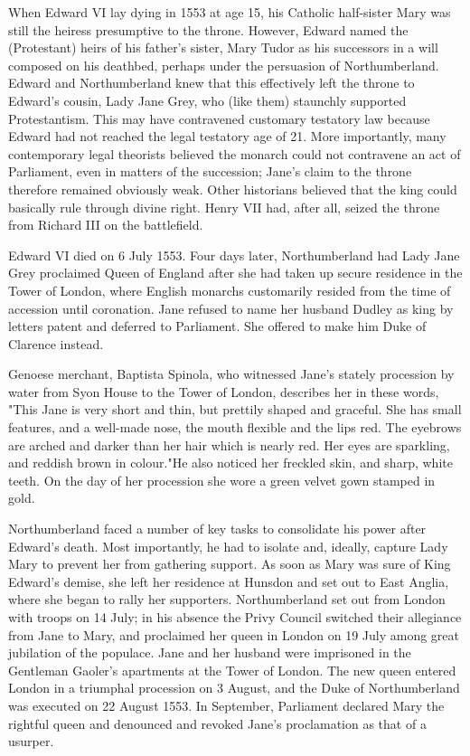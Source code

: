\documentclass{article}
\begin{document}
When Edward VI lay dying in 1553 at age 15, his Catholic half-sister Mary was still the heiress presumptive to the throne. However, Edward named the (Protestant) heirs of his father's sister, Mary Tudor as his successors in a will composed on his deathbed, perhaps under the persuasion of Northumberland. Edward and Northumberland knew that this effectively left the throne to Edward's cousin, Lady Jane Grey, who (like them) staunchly supported Protestantism. This may have contravened customary testatory law because Edward had not reached the legal testatory age of 21. More importantly, many contemporary legal theorists believed the monarch could not contravene an act of Parliament, even in matters of the succession; Jane's claim to the throne therefore remained obviously weak. Other historians believed that the king could basically rule through divine right. Henry VII had, after all, seized the throne from Richard III on the battlefield.

Edward VI died on 6 July 1553. Four days later, Northumberland had Lady Jane Grey proclaimed Queen of England after she had taken up secure residence in the Tower of London, where English monarchs customarily resided from the time of accession until coronation. Jane refused to name her husband Dudley as king by letters patent and deferred to Parliament. She offered to make him Duke of Clarence instead.

Genoese merchant, Baptista Spinola, who witnessed Jane's stately procession by water from Syon House to the Tower of London, describes her in these words, "This Jane is very short and thin, but prettily shaped and graceful. She has small features, and a well-made nose, the mouth flexible and the lips red. The eyebrows are arched and darker than her hair which is nearly red. Her eyes are sparkling, and reddish brown in colour."He also noticed her freckled skin, and sharp, white teeth. On the day of her procession she wore a green velvet gown stamped in gold.

Northumberland faced a number of key tasks to consolidate his power after Edward's death. Most importantly, he had to isolate and, ideally, capture Lady Mary to prevent her from gathering support. As soon as Mary was sure of King Edward's demise, she left her residence at Hunsdon and set out to East Anglia, where she began to rally her supporters. Northumberland set out from London with troops on 14 July; in his absence the Privy Council switched their allegiance from Jane to Mary, and proclaimed her queen in London on 19 July among great jubilation of the populace. Jane and her husband were imprisoned in the Gentleman Gaoler's apartments at the Tower of London. The new queen entered London in a triumphal procession on 3 August, and the Duke of Northumberland was executed on 22 August 1553. In September, Parliament declared Mary the rightful queen and denounced and revoked Jane's proclamation as that of a usurper.
\end{document}
